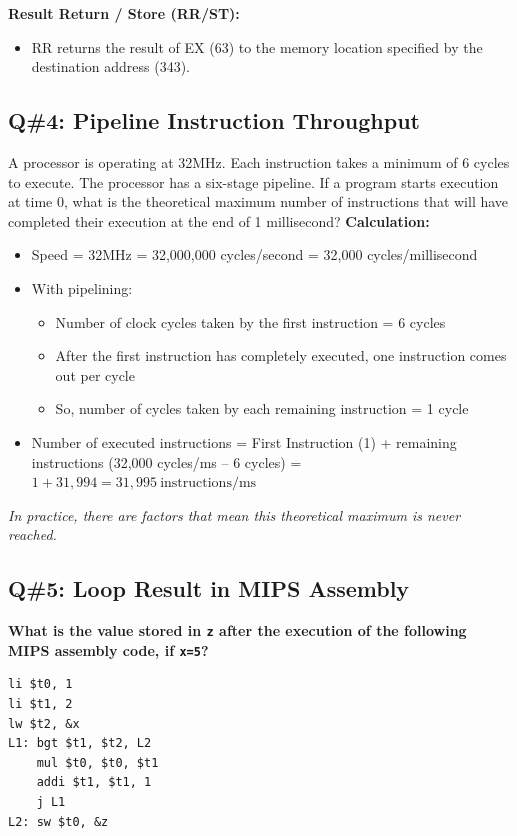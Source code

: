 \textbf{Result Return / Store (RR/ST):}
\begin{itemize}
  \item RR returns the result of EX (63) to the memory location specified by the destination address (343).
\end{itemize}

\subsection*{Q\#4: Pipeline Instruction Throughput}
A processor is operating at 32MHz. Each instruction takes a minimum of 6 cycles to execute. The processor has a six-stage pipeline. If a program starts execution at time 0, what is the theoretical maximum number of instructions that will have completed their execution at the end of 1 millisecond?
\textbf{Calculation:}
\begin{itemize}
  \item Speed = 32MHz = 32,000,000 cycles/second = 32,000 cycles/millisecond
  \item With pipelining:
    \begin{itemize}
      \item Number of clock cycles taken by the first instruction = 6 cycles
      \item After the first instruction has completely executed, one instruction comes out per cycle
      \item So, number of cycles taken by each remaining instruction = 1 cycle
    \end{itemize}
  \item Number of executed instructions = First Instruction (1) + remaining instructions (32,000 cycles/ms – 6 cycles) = $1 + 31,994 = \boxed{31,995\ \text{instructions/ms}}$
\end{itemize}

\textit{In practice, there are factors that mean this theoretical maximum is never reached.}

\subsection*{Q\#5: Loop Result in MIPS Assembly}

\textbf{What is the value stored in \texttt{z} after the execution of the following MIPS assembly code, if \texttt{x=5}?}

\begin{lstlisting}
li $t0, 1
li $t1, 2
lw $t2, &x
L1: bgt $t1, $t2, L2
    mul $t0, $t0, $t1
    addi $t1, $t1, 1
    j L1
L2: sw $t0, &z
\end{lstlisting}

